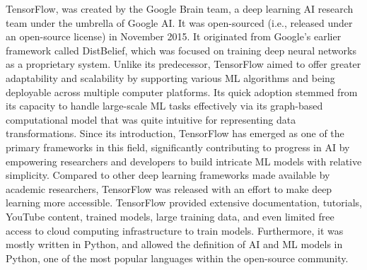 \documentclass[CHICAGO,Times1COL]{WileyNJDv5} %
\begin{document}
TensorFlow,  was created by the Google Brain team, a deep learning \ac{AI} research team under the umbrella of Google AI. It was open-sourced (i.e., released under an open-source license) in November 2015. It originated from Google's earlier framework called DistBelief, which was focused on training deep neural networks as a proprietary system. Unlike its predecessor, TensorFlow aimed to offer greater adaptability and scalability by supporting various \ac{ML} algorithms and being deployable across multiple computer platforms. Its quick adoption stemmed from its capacity to handle large-scale \ac{ML} tasks effectively via its graph-based computational model that was quite intuitive for representing data transformations. Since its introduction, TensorFlow has emerged as one of the primary frameworks in this field, significantly contributing to progress in \ac{AI} by empowering researchers and developers to build intricate \ac{ML} models with relative simplicity. Compared to other deep learning frameworks made available by academic researchers, TensorFlow was released with an effort to make deep learning more accessible. TensorFlow provided extensive documentation, tutorials, YouTube content, trained models, large training data, and even limited free access to cloud computing infrastructure to train models. Furthermore, it was mostly written in Python, and allowed the definition of \ac{AI} and \ac{ML} models in Python, one of the most popular languages within the open-source community.  





\end{document}
